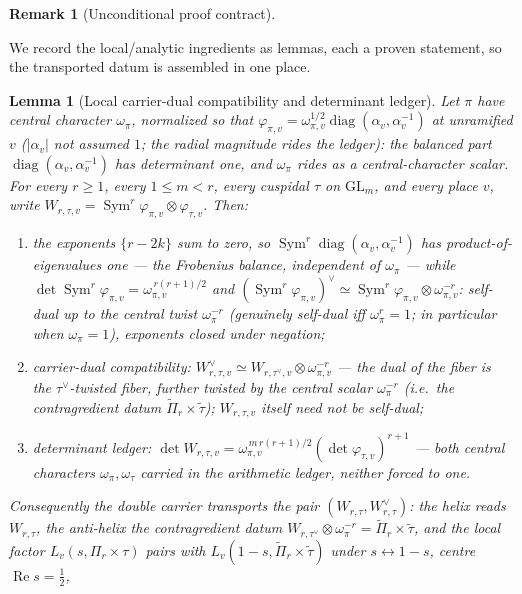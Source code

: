 \documentclass[11pt]{article}
\newtheorem{lemma}[theorem]{Lemma}
\theoremstyle{definition}
\newtheorem{remark}[theorem]{Remark}
\renewcommand{\Re}{\operatorname{Re}}
\newcommand{\Sym}{\operatorname{Sym}}
\begin{document}
\begin{remark}[Unconditional proof contract]
\begin{enumerate}
We record the local/analytic ingredients as lemmas, each a proven statement, so the transported datum is
assembled in one place.

\begin{lemma}[Local carrier-dual compatibility and determinant ledger]\label{lem:selfdual}
Let $\pi$ have central character $\omega_\pi$, normalized so that $\varphi_{\pi,v}=\omega_{\pi,v}^{1/2}\operatorname{diag}(\alpha_v,\alpha_v^{-1})$ at unramified $v$ ($|\alpha_v|$ not assumed $1$; the radial magnitude rides the ledger): the balanced part $\operatorname{diag}(\alpha_v,\alpha_v^{-1})$ has determinant one, and
$\omega_\pi$ rides as a central-character scalar. For every $r\ge1$, every $1\le m<r$, every cuspidal $\tau$ on
$\mathrm{GL}_m$, and every place $v$, write $W_{r,\tau,v}=\Sym^r\varphi_{\pi,v}\otimes\varphi_{\tau,v}$. Then:
\begin{enumerate}
\item[\textup{(i)}] the exponents $\{r-2k\}$ sum to zero, so $\Sym^r\operatorname{diag}(\alpha_v,\alpha_v^{-1})$
has product-of-eigenvalues one --- the \emph{Frobenius balance}, independent of $\omega_\pi$ --- while
$\det\Sym^r\varphi_{\pi,v}=\omega_{\pi,v}^{\,r(r+1)/2}$ and $(\Sym^r\varphi_{\pi,v})^\vee\simeq
\Sym^r\varphi_{\pi,v}\otimes\omega_{\pi,v}^{-r}$: self-dual \emph{up to the central twist} $\omega_\pi^{-r}$
(genuinely self-dual iff $\omega_\pi^r=1$; in particular when $\omega_\pi=1$), exponents closed under negation;
\item[\textup{(ii)}] \emph{carrier-dual compatibility}: $W_{r,\tau,v}^\vee\simeq W_{r,\tau^\vee,v}\otimes
\omega_{\pi,v}^{-r}$ --- the dual of the fiber is the $\tau^\vee$-twisted fiber, further twisted by the central
scalar $\omega_\pi^{-r}$ (i.e.\ the contragredient datum $\widetilde\Pi_r\times\widetilde\tau$); $W_{r,\tau,v}$
itself \emph{need not} be self-dual;
\item[\textup{(iii)}] \emph{determinant ledger}: $\det W_{r,\tau,v}=\omega_{\pi,v}^{\,m\,r(r+1)/2}
(\det\varphi_{\tau,v})^{r+1}$ --- \emph{both} central characters $\omega_\pi,\omega_\tau$ carried in the
arithmetic ledger, neither forced to one.
\end{enumerate}
Consequently the double carrier transports the \emph{pair} $(W_{r,\tau},W_{r,\tau}^\vee)$: the helix reads
$W_{r,\tau}$, the anti-helix the contragredient datum $W_{r,\tau^\vee}\otimes\omega_\pi^{-r}=
\widetilde\Pi_r\times\widetilde\tau$, and the local factor $L_v(s,\Pi_r\times\tau)$ pairs with
$L_v(1-s,\widetilde\Pi_r\times\widetilde\tau)$ under $s\leftrightarrow1-s$, centre $\Re s=\tfrac12$,

\end{lemma}
\end{enumerate}
\end{remark}
\end{document}
